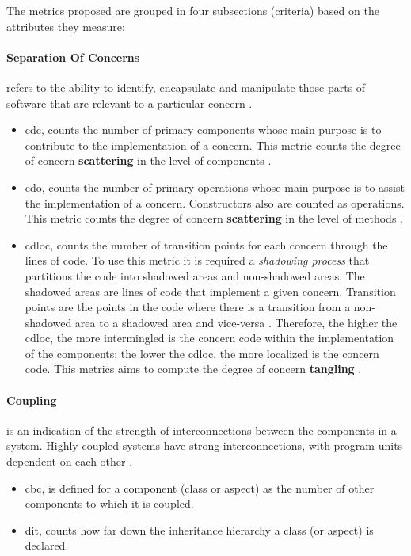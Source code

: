 The metrics proposed \cite{sant2003reuse} are grouped in four subsections (criteria) based on the attributes they measure:

\paragraph{Separation Of Concerns}refers to the ability to identify, encapsulate and manipulate those parts of software that are relevant to a particular concern \cite{tarr1999n}.
	\begin{itemize}
		\item \ac{cdc}, counts the number of primary components whose main purpose is to contribute to the implementation of a concern.
		This metric counts the degree of concern \textbf{scattering} in the level of components \cite{figueiredo2008maintainability}.

		\item \ac{cdo}, counts the number of primary operations whose main purpose is to assist the implementation of a concern.
		Constructors also are counted as operations.
		This metric counts the degree of concern \textbf{scattering} in the level of methods \cite{figueiredo2008maintainability}.

		\item \ac{cdloc}, counts the number of transition points for each concern through the lines of code.
		To use this metric it is required a \textit{shadowing process} that partitions the code into shadowed areas and non-shadowed areas. 
		The shadowed areas are lines of code that implement a given concern. 
		Transition points are the points in the code where there is a transition from a non-shadowed area to a shadowed area and vice-versa \cite{garcia2003agents}.
		Therefore, the higher the \ac{cdloc}, the more intermingled is the concern code within the implementation of the components; the lower the \ac{cdloc}, the more localized is the concern code.
		This metrics aims to compute the degree of concern \textbf{tangling} \cite{figueiredo2008maintainability}.
	\end{itemize}

\paragraph{Coupling}is an indication of the strength of interconnections between the components in a system. Highly coupled systems have strong interconnections, with program units dependent on each other \cite{sommerville2004software}.
	\begin{itemize}
		\item \ac{cbc}, is defined for a component (class or aspect) as the number of other components to which it is coupled.

		\item \ac{dit}, counts how far down the inheritance hierarchy a class (or aspect) is declared.
	\end{itemize}

